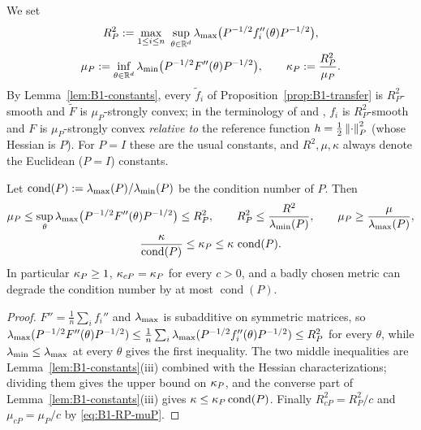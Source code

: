 \begin{definition}\label{def:B1-kappaP}
We set
\begin{equation}\label{eq:B1-RP-muP}
\begin{gathered}
R_P^2:=\max_{1\le i\le n}\ \sup_{\theta\in\R^d}\lmax\big(P^{-1/2}f_i''(\theta)P^{-1/2}\big),\\
\mu_P:=\inf_{\theta\in\R^d}\lmin\big(P^{-1/2}F''(\theta)P^{-1/2}\big),\qquad
\kappaP:=\frac{R_P^2}{\mu_P} .
\end{gathered}
\end{equation}
By Lemma~\ref{lem:B1-constants}, every $\tilde f_i$ of Proposition~\ref{prop:B1-transfer} is $R_P^2$-smooth
and $\tilde F$ is $\mu_P$-strongly convex; in the terminology of \cite[Def.~1]{hendrikx2020statistically} and
\cite{lu2018relatively}, $f_i$ is $R_P^2$-smooth and $F$ is $\mu_P$-strongly convex \emph{relative to} the reference
function $h=\frac12\left\|\cdot\right\|_P^2$ (whose Hessian is $P$). For $P=I$ these are the usual constants, and
$R^2,\mu,\kappa$ always denote the Euclidean ($P=I$) constants.
\end{definition}

\begin{lemma}\label{lem:B1-compare}
Let $\operatorname{cond}(P):=\lambda_{\max}(P)/\lambda_{\min}(P)$ be the condition number of $P$. Then
\begin{gather}
\mu_P\le\sup_\theta\lambda_{\max}\big(P^{-1/2}F''(\theta)P^{-1/2}\big)\le R_P^2,\qquad
R_P^2\le\frac{R^2}{\lambda_{\min}(P)},\qquad \mu_P\ge\frac{\mu}{\lambda_{\max}(P)},\nonumber\\
\frac{\kappa}{\operatorname{cond}(P)}\le\kappa_P\le\kappa\,\operatorname{cond}(P).\label{eq:B1-kappaP-vs-kappa}
\end{gather}
In particular $\kappa_P\ge1$, $\kappa_{cP}=\kappa_P$ for every $c>0$, and a badly chosen metric can degrade
the condition number by at most $\operatorname{cond}(P)$.
\end{lemma}
\begin{proof}
$F''=\frac1n\sum_i f_i''$ and $\lambda_{\max}$ is subadditive on symmetric matrices, so
$\lambda_{\max}(P^{-1/2}F''(\theta)P^{-1/2})\le\frac1n\sum_i\lambda_{\max}(P^{-1/2}f_i''(\theta)P^{-1/2})\le R_P^2$ for every
$\theta$, while $\lambda_{\min}\le\lambda_{\max}$ at every $\theta$ gives the first inequality. The two middle inequalities
are Lemma~\ref{lem:B1-constants}(iii) combined with the Hessian characterizations; dividing them gives the
upper bound on $\kappa_P$, and the converse part of Lemma~\ref{lem:B1-constants}(iii) gives
$\kappa\le\kappa_P\operatorname{cond}(P)$. Finally $R_{cP}^2=R_P^2/c$ and $\mu_{cP}=\mu_P/c$ by
\eqref{eq:B1-RP-muP}.
\end{proof}

